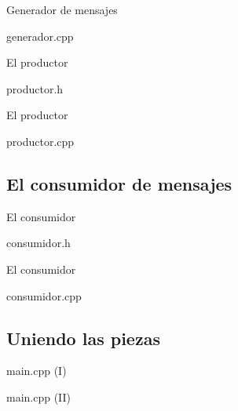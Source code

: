 \begin{frame}{Generador de mensajes}
\begin{block}{generador.cpp}

\end{block}
\end{frame}

\begin{frame}{El productor}
\begin{block}{productor.h}

\end{block}
\end{frame}

\begin{frame}{El productor}
\begin{block}{productor.cpp}

\end{block}
\end{frame}

\subsection{El consumidor de mensajes}

\begin{frame}{El consumidor}
\begin{block}{consumidor.h}

\end{block}
\end{frame}

\begin{frame}{El consumidor}
\begin{block}{consumidor.cpp}

\end{block}
\end{frame}

\subsection{Uniendo las piezas}

\begin{frame}
\begin{block}{main.cpp (I)}

\end{block}
\end{frame}

\begin{frame}
\begin{block}{main.cpp (II)}

\end{block}
\end{frame}



